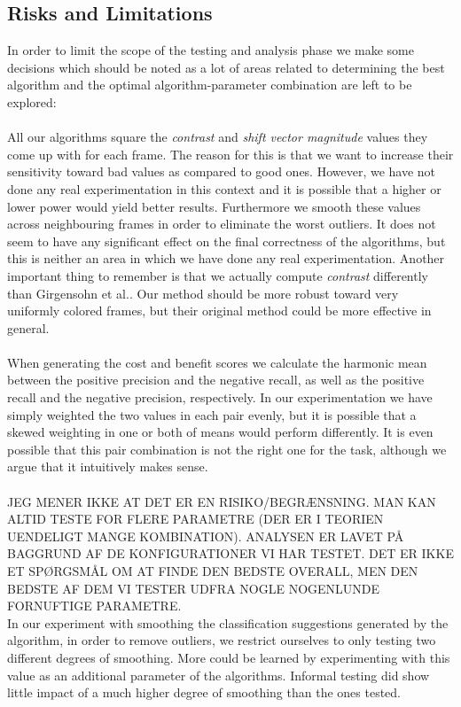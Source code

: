 \subsection{Risks and Limitations}
In order to limit the scope of the testing and analysis phase we make some decisions which should be noted as a lot of areas related to determining the best algorithm and the optimal algorithm-parameter combination are left to be explored:\\
\\
All our algorithms square the \textit{contrast} and \textit{shift vector magnitude} values they come up with for each frame. The reason for this is that we want to increase their sensitivity toward bad values as compared to good ones. However, we have not done any real experimentation in this context and it is possible that a higher or lower power would yield better results. Furthermore we smooth these values across neighbouring frames in order to eliminate the worst outliers. It does not seem to have any significant effect on the final correctness of the algorithms, but this is neither an area in which we have done any real experimentation. Another important thing to remember is that we actually compute \textit{contrast} differently than Girgensohn et al.\cite{Girgensohn:2000:SAH:354401.354415}. Our method should be more robust toward very uniformly colored frames, but their original method could be more effective in general.\\
\\
When generating the cost and benefit scores we calculate the harmonic mean between the positive precision and the negative recall, as well as the positive recall and the negative precision, respectively. In our experimentation we have simply weighted the two values in each pair evenly, but it is possible that a skewed weighting in one or both of means would perform differently. It is even possible that this pair combination is not the right one for the task, although we argue that it intuitively makes sense.\\
\\
JEG MENER IKKE AT DET ER EN RISIKO/BEGRÆNSNING. MAN KAN ALTID TESTE FOR FLERE PARAMETRE (DER ER I TEORIEN UENDELIGT MANGE KOMBINATION). ANALYSEN ER LAVET PÅ BAGGRUND AF DE KONFIGURATIONER VI HAR TESTET. DET ER IKKE ET SPØRGSMÅL OM AT FINDE DEN BEDSTE OVERALL, MEN DEN BEDSTE AF DEM VI TESTER UDFRA NOGLE NOGENLUNDE FORNUFTIGE PARAMETRE.\\
In our experiment with smoothing the classification suggestions generated by the algorithm, in order to remove outliers, we restrict ourselves to only testing two different degrees of smoothing. More could be learned by experimenting with this value as an additional parameter of the algorithms. Informal testing did show little impact of a much higher degree of smoothing than the ones tested. \\
